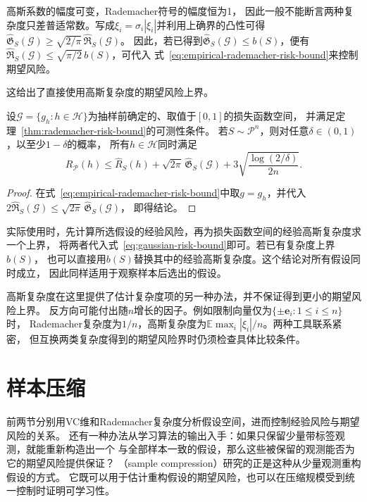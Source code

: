 高斯系数的幅度可变，Rademacher符号的幅度恒为1，
因此一般不能断言两种复杂度只差普适常数。写成$\xi_i=\sigma_i|\xi_i|$并利用上确界的凸性可得
$\widehat{\mathfrak G}_S(\mathcal G)\geq\sqrt{2/\pi}\,\widehat{\mathfrak R}_S(\mathcal G)$。
因此，若已得到$\widehat{\mathfrak G}_S(\mathcal G)\leq b(S)$，便有
$\widehat{\mathfrak R}_S(\mathcal G)\leq\sqrt{\pi/2}\,b(S)$，可代入
式~\eqref{eq:empirical-rademacher-risk-bound}来控制期望风险。

这给出了直接使用高斯复杂度的期望风险上界。

\begin{theorem}[高斯复杂度给出的期望风险上界]
\label{thm:gaussian-risk-bound}
设$\mathcal G=\{g_h:h\in\mathcal H\}$为抽样前确定的、取值于$[0,1]$的损失函数空间，
并满足定理~\ref{thm:rademacher-risk-bound}的可测性条件。
若$S\sim\mathcal P^n$，则对任意$\delta\in(0,1)$，以至少$1-\delta$的概率，
所有$h\in\mathcal H$同时满足
\begin{equation}
 R_{\mathcal P}(h)\leq\hat R_S(h)
 +\sqrt{2\pi}\,\widehat{\mathfrak G}_S(\mathcal G)
 +3\sqrt{\frac{\log(2/\delta)}{2n}}.
 \label{eq:gaussian-risk-bound}
\end{equation}
\end{theorem}

\begin{proof}
在式~\eqref{eq:empirical-rademacher-risk-bound}中取$g=g_h$，并代入
$2\widehat{\mathfrak R}_S(\mathcal G)\leq\sqrt{2\pi}\,\widehat{\mathfrak G}_S(\mathcal G)$，
即得结论。
\end{proof}

实际使用时，先计算所选假设的经验风险，再为损失函数空间的经验高斯复杂度求一个上界，
将两者代入式~\eqref{eq:gaussian-risk-bound}即可。若已有复杂度上界$b(S)$，
也可以直接用$b(S)$替换其中的经验高斯复杂度。这个结论对所有假设同时成立，
因此同样适用于观察样本后选出的假设。

高斯复杂度在这里提供了估计复杂度项的另一种办法，并不保证得到更小的期望风险上界。
反方向可能付出随$n$增长的因子。例如限制向量仅为$\{\pm\bm e_i:1\leq i\leq n\}$时，
Rademacher复杂度为$1/n$，高斯复杂度为$\mathbb E\max_i|\xi_i|/n$。两种工具联系紧密，
但互换两类复杂度得到的期望风险界时仍须检查具体比较条件。

\section{样本压缩}
\label{sec:sample-compression}

前两节分别用VC维和Rademacher复杂度分析假设空间，进而控制经验风险与期望风险的关系。
还有一种办法从学习算法的输出入手：如果只保留少量带标签观测，就能重新构造出一个
与全部样本一致的假设，那么这些被保留的观测能否为它的期望风险提供保证？
（sample compression）研究的正是这种从少量观测重构假设的方式。
它既可以用于估计重构假设的期望风险，也可以在压缩规模受到统一控制时证明可学习性。

